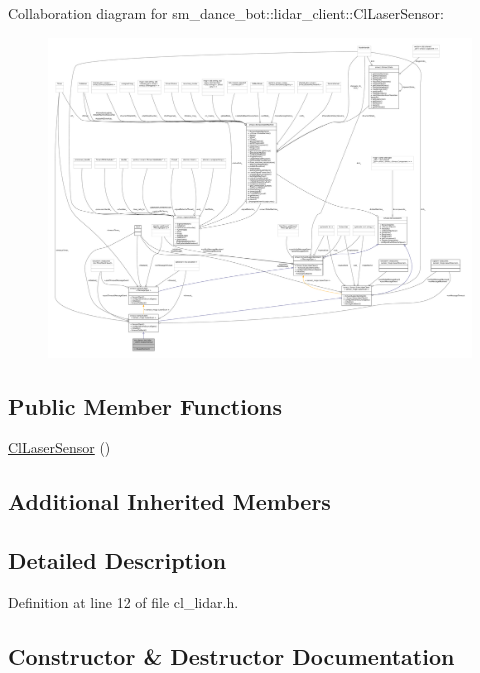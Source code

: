Collaboration diagram for sm\+\_\+dance\+\_\+bot\+:\+:lidar\+\_\+client\+:\+:Cl\+Laser\+Sensor\+:
\nopagebreak
\begin{figure}[H]
\begin{center}
\leavevmode
\includegraphics[width=350pt]{classsm__dance__bot_1_1lidar__client_1_1ClLaserSensor__coll__graph}
\end{center}
\end{figure}
\subsection*{Public Member Functions}
\begin{DoxyCompactItemize}
\item 
\hyperlink{classsm__dance__bot_1_1lidar__client_1_1ClLaserSensor_a269e95785a2d3a4cdbb3b90fc413370f}{Cl\+Laser\+Sensor} ()
\end{DoxyCompactItemize}
\subsection*{Additional Inherited Members}


\subsection{Detailed Description}


Definition at line 12 of file cl\+\_\+lidar.\+h.



\subsection{Constructor \& Destructor Documentation}
